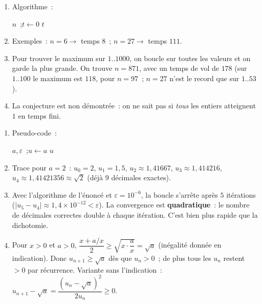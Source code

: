 
\begin{enumerate}
  \item Algorithme~:
\begin{algorithm}[H]
\caption{Temps de vol de Collatz}
\Lire $n$~;\quad $t \leftarrow 0$\;
\Afficher $t$\;
\end{algorithm}
  \item Exemples~: $n=6\to$ temps $8$~; $n=27\to$ temps $111$.
  \item Pour trouver le maximum sur $1..1000$, on boucle sur toutes les valeurs et on garde la plus grande.
        On trouve $n=871$, avec un temps de vol de $178$ (sur $1..100$ le maximum est $118$, pour $n=97$~; $n=27$ n'est le record que sur $1..53$).
  \item La conjecture est non d\'emontr\'ee~: on ne sait pas si \emph{tous} les entiers
        atteignent $1$ en temps fini.
\end{enumerate}


\begin{enumerate}
  \item Pseudo-code~:
\begin{algorithm}[H]
\caption{M\'ethode de H\'eron}
\Lire $a, \varepsilon$~;\quad $u \leftarrow a$\;
\Afficher $u$\;
\end{algorithm}
  \item Trace pour $a=2$~: $u_0=2$, $u_1=1{,}5$, $u_2\approx1{,}41667$,
        $u_3\approx1{,}414216$, $u_4\approx1{,}41421356\approx\sqrt{2}$ (d\'ej\`a $9$ d\'ecimales exactes).
  \item Avec l'algorithme de l'\'enonc\'e et $\varepsilon=10^{-6}$, la boucle s'arr\^ete apr\`es $5$ it\'erations ($|u_5-u_4|\approx1{,}4\times10^{-12}<\varepsilon$). La convergence est \textbf{quadratique}~: le nombre de d\'ecimales correctes
        double \`a chaque it\'eration. C'est bien plus rapide que la dichotomie.
  \item Pour $x>0$ et $a>0$, $\dfrac{x+a/x}{2}\ge\sqrt{x\cdot\dfrac ax}=\sqrt a$ (in\'egalit\'e donn\'ee en indication). Donc $u_{n+1}\ge\sqrt a$ d\`es que $u_n>0$~; de plus tous les $u_n$ restent $>0$ par r\'ecurrence. Variante sans l'indication~: $u_{n+1}-\sqrt a=\dfrac{(u_n-\sqrt a)^2}{2u_n}\ge0$.
\end{enumerate}

